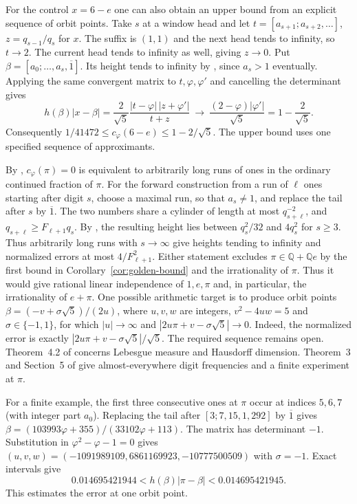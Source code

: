 \documentclass[11pt]{amsart}
\theoremstyle{definition}
\theoremstyle{remark}
\numberwithin{equation}{section}
\newcommand{\Q}{\mathbb{Q}}
\begin{document}
For the control $x=6-e$ one can also obtain an upper bound from an
explicit sequence of orbit points. Take $s$ at a window head and
let $t=[a_{s+1};a_{s+2},\ldots]$, $z=q_{s-1}/q_s$ for $x$.
The suffix is $(1,1)$ and the next head tends to infinity, so
$t\to2$. The current head tends to infinity as well, giving $z\to0$.
Put $\beta=[a_0;\ldots,a_s,\overline1]$. Its height tends to infinity
by \cite[Lemma~2.1]{BugeaudQuad}, since $a_s>1$ eventually.
Applying the same convergent matrix to $t,\varphi,\varphi'$ and
cancelling the determinant gives
\[
 h(\beta)|x-\beta|
 =\frac{2}{\sqrt5}\frac{|t-\varphi|\,|z+\varphi'|}{t+z}
 \ \longrightarrow\ \frac{(2-\varphi)|\varphi'|}{\sqrt5}
 =1-\frac{2}{\sqrt5}.
\]
Consequently $1/41472\le c_\varphi(6-e)\le1-2/\sqrt5$.
The upper bound uses one specified sequence of approximants.

By \cite[Lemma~4.1]{BugeaudQuad}, $c_\varphi(\pi)=0$ is equivalent to
arbitrarily long runs of ones in the ordinary continued fraction of $\pi$.
For the forward construction from a run of $\ell$ ones starting after
digit $s$, choose a maximal run, so that $a_s\ne1$, and replace the
tail after $s$ by $\overline{1}$. The two numbers share a cylinder
of length at most $q_{s+\ell}^{-2}$, and
$q_{s+\ell}\ge F_{\ell+1}q_s$.
By \cite[Lemma~2.1]{BugeaudQuad}, the resulting height lies between
$q_s^2/32$ and $4q_s^2$ for $s\ge3$. Thus arbitrarily long runs with
$s\to\infty$ give heights tending to infinity and normalized errors
at most $4/F_{\ell+1}^2$.
Either statement excludes $\pi\in\Q+\Q e$ by the first bound in
Corollary~\ref{cor:golden-bound} and the irrationality of $\pi$.
Thus it would give rational linear independence of $1,e,\pi$ and,
in particular, the irrationality of $e+\pi$.
One possible arithmetic target is to produce orbit points
$\beta=(-v+\sigma\sqrt5)/(2u)$, where $u,v,w$ are integers,
$v^2-4uw=5$ and $\sigma\in\{-1,1\}$, for which $|u|\to\infty$ and
$|2u\pi+v-\sigma\sqrt5|\to0$. Indeed, the normalized error is exactly
$|2u\pi+v-\sigma\sqrt5|/\sqrt5$. The required sequence remains open.
Theorem~4.2 of \cite{BugeaudQuad} concerns Lebesgue measure and
Hausdorff dimension. Theorem~3 and Section~5 of \cite{Hildebrand2024}
give almost-everywhere digit frequencies and a finite experiment at $\pi$.

For a finite example, the first three consecutive ones at $\pi$ occur
at indices $5,6,7$ (with integer part $a_0$).
Replacing the tail after $[3;7,15,1,292]$ by $\overline{1}$ gives
$\beta=(103993\varphi+355)/(33102\varphi+113)$. The matrix has
determinant $-1$. Substitution in $\varphi^2-\varphi-1=0$ gives
$(u,v,w)=(-1091989109,6861169923,-10777500509)$ with $\sigma=-1$.
Exact intervals give
\[
  0.014695421944 < h(\beta)|\pi-\beta| < 0.014695421945 .
\]
This estimates the error at one orbit point.
\end{document}
